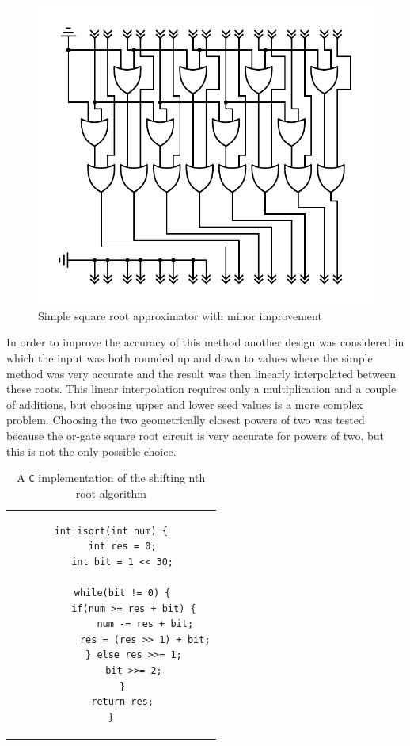 			\begin{figure}
				\centering
				\caption{Simple square root approximator with minor improvement}
				\label{orsqrt2}
				\includegraphics[width=0.75\linewidth]{figure/pdf/sqrt2Or.pdf} 
			\end{figure}

			In order to improve the accuracy of this method another design was
			considered in which the input was both rounded up and down to 
			values where the simple method was very accurate and the result was
			then linearly interpolated between these roots. This linear 
			interpolation requires only a multiplication and a couple of 
			additions, but choosing upper and lower seed values is a more 
			complex problem. Choosing the two geometrically closest powers of 
			two was tested because the or-gate square root circuit is very
			accurate for powers of two, but this is not the only possible 
			choice.

			\begin{table}
				\centering
				\caption{A \texttt{C} implementation of the shifting nth root 
					algorithm}
				\label{sqrtc}
				\begin{tabular}{c}
				\begin{lstlisting}
int isqrt(int num) {
    int res = 0;
    int bit = 1 << 30;

    while(bit != 0) {
        if(num >= res + bit) {
            num -= res + bit;
            res = (res >> 1) + bit;
        } else res >>= 1;
        bit >>= 2;
    }
    return res;
}
				\end{lstlisting}
				\end{tabular}
			\end{table}

